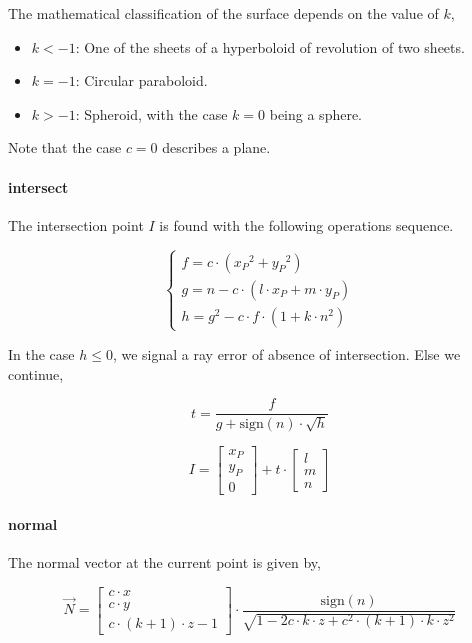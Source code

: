 The mathematical classification of the surface depends on the value of
$k$,

\begin{itemize}
\item $k < -1$: One of the sheets of a hyperboloid of revolution of two sheets.
\item $k = -1$: Circular paraboloid.
\item $k > -1$: Spheroid, with the case $k=0$ being a sphere.
\end{itemize}

Note that the case $c=0$ describes a plane.

\paragraph{intersect}
The intersection point $I$ is found with the following operations sequence.

\begin{equation} \begin{cases}
f = c \cdot ({x_P}^2 + {y_P}^2) \\
g = n - c \cdot (l \cdot x_P + m \cdot y_P) \\
h = g^2 - c \cdot f \cdot (1 + k \cdot n^2)
\end{cases} \end{equation}

In the case $h \leq 0$, we signal a ray error of absence of intersection.
Else we continue,

\begin{equation}
t = \frac{f}{g + \textrm{sign}(n) \cdot \sqrt{h}}
\end{equation}

\begin{equation}
I = \begin{bmatrix} x_P \\ y_P \\ 0 \end{bmatrix} + t \cdot
    \begin{bmatrix} l \\ m \\ n \end{bmatrix}
\end{equation}

\paragraph{normal}
The normal vector at the current point is given by,

\begin{equation}
\overrightarrow{N} =
\begin{bmatrix}
c \cdot x \\ c \cdot y \\ c \cdot (k+1) \cdot z - 1
\end{bmatrix} \cdot
\frac{\textrm{sign}(n)}{
\sqrt{1 - 2 c \cdot k \cdot z + c^2 \cdot (k+1) \cdot k \cdot z^2}}
\end{equation}

